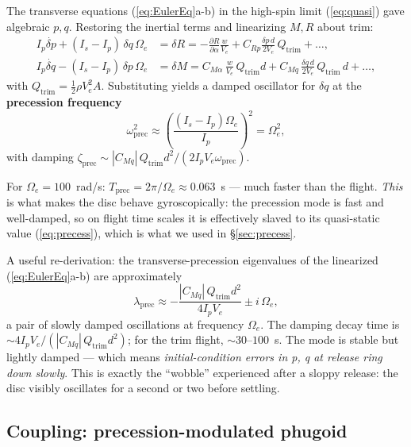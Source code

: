 \documentclass[11pt,letterpaper]{article}
\begin{document}
The transverse equations (\ref{eq:EulerEq}a-b) in the high-spin limit (\ref{eq:quasi}) gave algebraic $p, q$. Restoring the inertial terms and linearizing $M, R$ about trim:
\begin{align}
I_p \dot{\delta p} + (I_s - I_p)\,\delta q\,\Omega_e &= \delta R = -\tfrac{\partial R}{\partial \alpha}\tfrac{w}{V_e} + C_{Rp}\tfrac{\delta p\, d}{2 V_e}\,Q_{\text{trim}} + \ldots,\\
I_p \dot{\delta q} - (I_s - I_p)\,\delta p\,\Omega_e &= \delta M = C_{M\alpha}\,\tfrac{w}{V_e}\,Q_{\text{trim}} d + C_{Mq}\,\tfrac{\delta q\,d}{2V_e}\,Q_{\text{trim}}\,d + \ldots,
\end{align}
with $Q_{\text{trim}} = \tfrac{1}{2}\rho V_e^2 A$. Substituting yields a damped oscillator for $\delta q$ at the \textbf{precession frequency}
\begin{equation}
\omega_{\text{prec}}^2 \approx \left(\frac{(I_s - I_p)\Omega_e}{I_p}\right)^2 = \Omega_e^2,
\label{eq:omegaprec}
\end{equation}
with damping $\zeta_{\text{prec}} \sim |C_{Mq}|\,Q_{\text{trim}} d^2 / (2 I_p V_e \omega_{\text{prec}})$.

For $\Omega_e = 100$~rad/s: $T_{\text{prec}} = 2\pi/\Omega_e \approx 0.063$~s --- much faster than the flight. \emph{This} is what makes the disc behave gyroscopically: the precession mode is fast and well-damped, so on flight time scales it is effectively slaved to its quasi-static value (\ref{eq:precess}), which is what we used in \S\ref{sec:precess}.

A useful re-derivation: the transverse-precession eigenvalues of the linearized (\ref{eq:EulerEq}a-b) are approximately
\begin{equation}
\lambda_{\text{prec}} \approx -\frac{|C_{Mq}|\,Q_{\text{trim}} d^2}{4 I_p V_e} \pm i\,\Omega_e,
\label{eq:eigval}
\end{equation}
a pair of slowly damped oscillations at frequency $\Omega_e$. The damping decay time is $\sim 4 I_p V_e / (|C_{Mq}|\,Q_{\text{trim}} d^2)$; for the trim flight, $\sim 30$--$100$~s. The mode is stable but lightly damped --- which means \emph{initial-condition errors in p, q at release ring down slowly}. This is exactly the ``wobble'' experienced after a sloppy release: the disc visibly oscillates for a second or two before settling.

\subsection{Coupling: precession-modulated phugoid}
\end{document}
